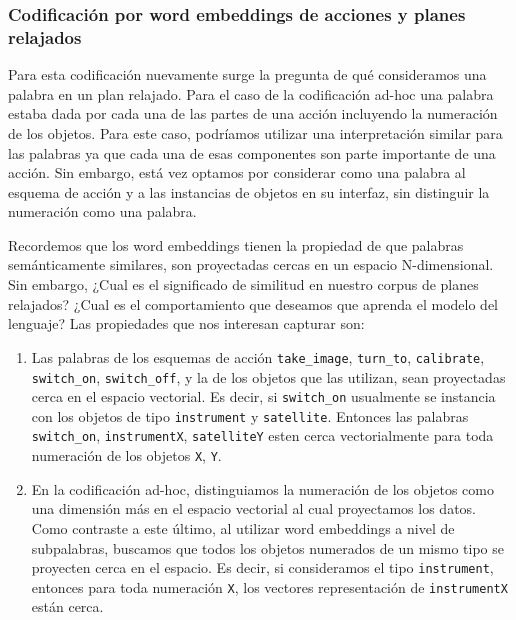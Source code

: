\subsubsection{Codificación por word embeddings de acciones y planes relajados}

Para esta codificación nuevamente surge la pregunta de qué consideramos una
palabra en un plan relajado. Para el caso de la codificación ad-hoc una palabra
estaba dada por cada una de las partes de una acción incluyendo la numeración de
los objetos. Para este caso, podríamos utilizar una interpretación similar para
las palabras ya que cada una de esas componentes son parte importante de una
acción. Sin embargo, está vez optamos por considerar como una palabra al esquema
de acción y a las instancias de objetos en su interfaz, sin distinguir la
numeración como una palabra.

Recordemos que los word embeddings tienen la propiedad de que palabras
semánticamente similares, son proyectadas cercas en un espacio N-dimensional.
Sin embargo, ¿Cual es el significado de similitud en nuestro corpus de planes
relajados? ¿Cual es el comportamiento que deseamos que aprenda el modelo del
lenguaje? Las propiedades que nos interesan capturar son:

\begin{enumerate}
    \item Las palabras de los esquemas de acción \verb|take_image|,
    \verb|turn_to|, \verb|calibrate|, \verb|switch_on|, \verb|switch_off|, y la
    de los objetos que las utilizan, sean proyectadas cerca en el espacio
    vectorial. Es decir, si \verb|switch_on| usualmente se instancia con los
    objetos de tipo \verb|instrument| y \verb|satellite|. Entonces las palabras
    \verb|switch_on|, \verb|instrumentX|, \verb|satelliteY| esten cerca
    vectorialmente para toda numeración de los objetos \verb|X|, \verb|Y|.
    \item En la codificación ad-hoc, distinguiamos la numeración de los objetos
    como una dimensión más en el espacio vectorial al cual proyectamos los
    datos. Como contraste a este último, al utilizar word embeddings a nivel de
    subpalabras, buscamos que todos los objetos numerados de un mismo tipo se
    proyecten cerca en el espacio. Es decir, si consideramos el tipo
    \verb|instrument|, entonces para toda numeración \verb|X|, los vectores
    representación de \verb|instrumentX| están cerca.
\end{enumerate}


